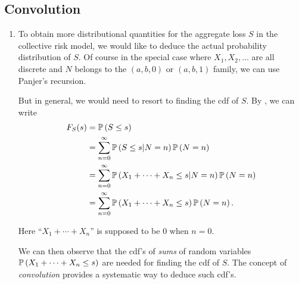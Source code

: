 \subsection{Convolution}
\begin{enumerate}
\item To obtain more distributional quantities for the aggregate loss \(S\) in
the collective risk model, we would like to deduce the actual probability
distribution of \(S\). Of course in the special case where \(X_1,X_2,\dotsc\)
are all discrete and \(N\) belongs to the \((a,b,0)\) or \((a,b,1)\) family, we
can use Panjer's recursion.

But in general, we would need to resort to finding the cdf of \(S\). By
, we can write
\begin{align*}
F_S(s)&=\mathbb{P}\left(S\le s\right) \\
&=\sum_{n=0}^{\infty}\mathbb{P}\left(S\le s|N=n\right)\mathbb{P}\left(N=n\right) \\
&=\sum_{n=0}^{\infty}\mathbb{P}\left(X_1+\dotsb+X_n\le s|N=n\right)\mathbb{P}\left(N=n\right) \\
&=\sum_{n=0}^{\infty}\mathbb{P}\left(X_1+\dotsb+X_n\le s\right)\mathbb{P}\left(N=n\right).
\end{align*}
\begin{note}
Here ``\(X_1+\dotsb+X_n\)'' is supposed to be \(0\) when \(n=0\).
\end{note}
We can then observe that the cdf's of \emph{sums} of random variables
\(\mathbb{P}\left(X_1+\dotsb+X_n\le s\right)\) are needed for finding the cdf of \(S\).
The concept of \emph{convolution} provides a systematic way to deduce such
cdf's.


\end{enumerate}

